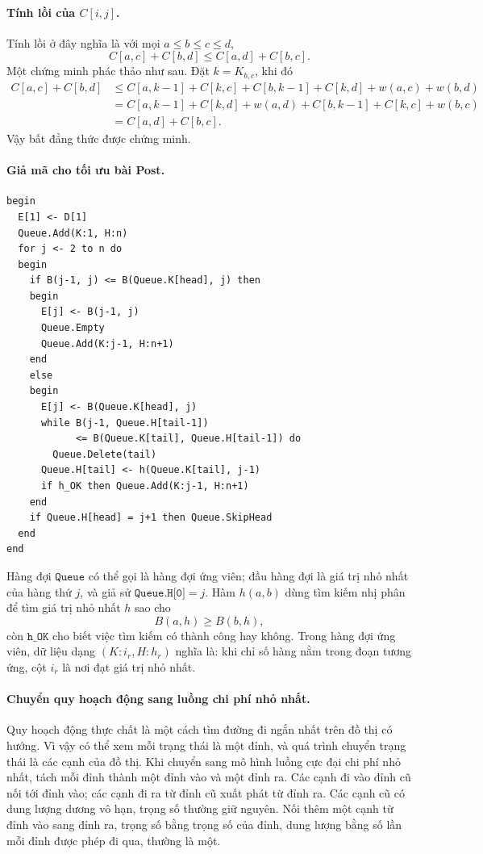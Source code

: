 \documentclass[11pt]{article}
\begin{document}
\paragraph{Tính lồi của \(C[i,j]\).}
Tính lồi ở đây nghĩa là với mọi \(a\le b\le c\le d\),
\[
  C[a,c]+C[b,d]\le C[a,d]+C[b,c].
\]
Một chứng minh phác thảo như sau. Đặt \(k=K_{b,c}\), khi đó
\[
\begin{aligned}
  C[a,c]+C[b,d]
  &\le C[a,k-1]+C[k,c]+C[b,k-1]+C[k,d]+w(a,c)+w(b,d)\\
  &= C[a,k-1]+C[k,d]+w(a,d)+C[b,k-1]+C[k,c]+w(b,c)\\
  &= C[a,d]+C[b,c].
\end{aligned}
\]
Vậy bất đẳng thức được chứng minh.

\paragraph{Giả mã cho tối ưu bài Post.}
\begin{verbatim}
begin
  E[1] <- D[1]
  Queue.Add(K:1, H:n)
  for j <- 2 to n do
  begin
    if B(j-1, j) <= B(Queue.K[head], j) then
    begin
      E[j] <- B(j-1, j)
      Queue.Empty
      Queue.Add(K:j-1, H:n+1)
    end
    else
    begin
      E[j] <- B(Queue.K[head], j)
      while B(j-1, Queue.H[tail-1])
            <= B(Queue.K[tail], Queue.H[tail-1]) do
        Queue.Delete(tail)
      Queue.H[tail] <- h(Queue.K[tail], j-1)
      if h_OK then Queue.Add(K:j-1, H:n+1)
    end
    if Queue.H[head] = j+1 then Queue.SkipHead
  end
end
\end{verbatim}

Hàng đợi \(\texttt{Queue}\) có thể gọi là hàng đợi ứng viên; đầu hàng đợi là
giá trị nhỏ nhất của hàng thứ \(j\), và giả sử \(\texttt{Queue.H[0]}=j\). Hàm
\(h(a,b)\) dùng tìm kiếm nhị phân để tìm giá trị nhỏ nhất \(h\) sao cho
\[
  B(a,h)\ge B(b,h),
\]
còn \(\texttt{h\_OK}\) cho biết việc tìm kiếm có thành công hay không. Trong
hàng đợi ứng viên, dữ liệu dạng \((K:i_r,H:h_r)\) nghĩa là: khi chỉ số hàng
nằm trong đoạn tương ứng, cột \(i_r\) là nơi đạt giá trị nhỏ nhất.

\paragraph{Chuyển quy hoạch động sang luồng chi phí nhỏ nhất.}
Quy hoạch động thực chất là một cách tìm đường đi ngắn nhất trên đồ thị có
hướng. Vì vậy có thể xem mỗi trạng thái là một đỉnh, và quá trình chuyển
trạng thái là các cạnh của đồ thị. Khi chuyển sang mô hình luồng cực đại chi
phí nhỏ nhất, tách mỗi đỉnh thành một đỉnh vào và một đỉnh ra. Các cạnh đi vào
đỉnh cũ nối tới đỉnh vào; các cạnh đi ra từ đỉnh cũ xuất phát từ đỉnh ra. Các
cạnh cũ có dung lượng dương vô hạn, trọng số thường giữ nguyên. Nối thêm một
cạnh từ đỉnh vào sang đỉnh ra, trọng số bằng trọng số của đỉnh, dung lượng
bằng số lần mỗi đỉnh được phép đi qua, thường là một.
\end{document}
